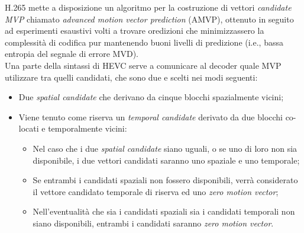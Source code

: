 H.265 mette a disposizione un algoritmo per la costruzione di vettori 
\emph{candidate MVP} chiamato \emph{advanced motion vector prediction} (AMVP), 
ottenuto in seguito ad esperimenti esaustivi volti a trovare oredizioni che 
minimizzassero la complessità di codifica pur mantenendo buoni livelli di 
predizione (i.e., bassa entropia del segnale di errore MVD).\\
Una parte della sintassi di HEVC serve a comunicare al decoder quale MVP 
utilizzare tra quelli candidati, che sono due e scelti nei modi seguenti:
\begin{itemize}
\item Due \emph{spatial candidate} che derivano da cinque blocchi spazialmente 
vicini;
\item Viene tenuto come riserva un \emph{temporal candidate} derivato da due 
blocchi co-locati e temporalmente vicini:
\begin{itemize}
\item Nel caso che i due \emph{spatial candidate} siano uguali, o se uno di loro
 non sia disponibile, i due vettori candidati saranno uno spaziale e uno 
temporale;

\item Se entrambi i candidati spaziali non fossero disponibili, verrà 
considerato il vettore candidato temporale di riserva ed uno 
\emph{zero motion vector};

\item Nell'eventualità che sia i candidati spaziali sia i candidati temporali 
non siano disponibili, entrambi i candidati saranno \emph{zero motion vector}.
\end{itemize}
\end{itemize}

